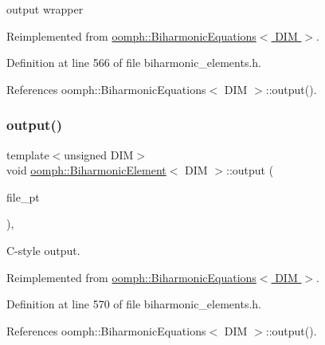 output wrapper 



Reimplemented from \hyperlink{classoomph_1_1BiharmonicEquations_a65124187a9935b51b6c635f457d0fa2c}{oomph\+::\+Biharmonic\+Equations$<$ D\+I\+M $>$}.



Definition at line 566 of file biharmonic\+\_\+elements.\+h.



References oomph\+::\+Biharmonic\+Equations$<$ D\+I\+M $>$\+::output().

\mbox{\label{classoomph_1_1BiharmonicElement_a405526be1bc18d1b758410767c1d1cae}} 
\subsubsection{\texorpdfstring{output()}{output()}\hspace{0.1cm}{\footnotesize\ttfamily [3/4]}}
{\footnotesize\ttfamily template$<$unsigned D\+IM$>$ \\
void \hyperlink{classoomph_1_1BiharmonicElement}{oomph\+::\+Biharmonic\+Element}$<$ D\+IM $>$\+::output (\begin{DoxyParamCaption}\item[{F\+I\+LE $\ast$}]{file\+\_\+pt }\end{DoxyParamCaption})\hspace{0.3cm}{\ttfamily [inline]}, {\ttfamily [virtual]}}



C-\/style output. 



Reimplemented from \hyperlink{classoomph_1_1BiharmonicEquations_aab220ac5f1da0181b400b2b360889229}{oomph\+::\+Biharmonic\+Equations$<$ D\+I\+M $>$}.



Definition at line 570 of file biharmonic\+\_\+elements.\+h.



References oomph\+::\+Biharmonic\+Equations$<$ D\+I\+M $>$\+::output().

\mbox{\label{classoomph_1_1BiharmonicElement_a6466cb310679bf54811011f086ffb957}} 
